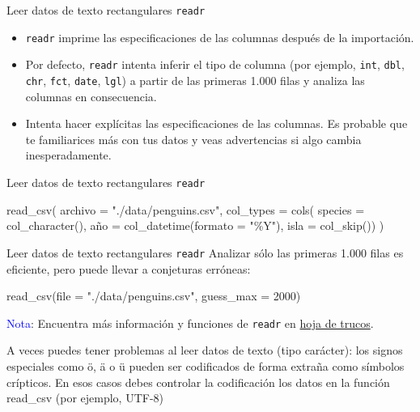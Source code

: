\documentclass[
  ignorenonframetext,
  aspectratio=169]{beamer}
\newenvironment{Shaded}{\begin{snugshade}}{\end{snugshade}}
\newcommand{\AttributeTok}[1]{\textcolor[rgb]{0.77,0.63,0.00}{#1}}
\newcommand{\DecValTok}[1]{\textcolor[rgb]{0.00,0.00,0.81}{#1}}
\newcommand{\FunctionTok}[1]{\textcolor[rgb]{0.00,0.00,0.00}{#1}}
\newcommand{\NormalTok}[1]{#1}
\newcommand{\OtherTok}[1]{\textcolor[rgb]{0.56,0.35,0.01}{#1}}
\newcommand{\StringTok}[1]{\textcolor[rgb]{0.31,0.60,0.02}{#1}}
\newcommand\blue[1]{\textcolor{blue}{#1}}
\begin{document}
\begin{frame}[fragile]{Leer datos de texto rectangulares \texttt{readr}}
\protect\hypertarget{leer-datos-de-texto-rectangulares-readr-5}{}
\begin{itemize}
\item
  \texttt{readr} imprime las especificaciones de las columnas después de
  la importación.
\item
  Por defecto, \texttt{readr} intenta inferir el tipo de columna (por
  ejemplo, \texttt{int}, \texttt{dbl}, \texttt{chr}, \texttt{fct},
  \texttt{date}, \texttt{lgl}) a partir de las primeras 1.000 filas y
  analiza las columnas en consecuencia.
\item
  Intenta hacer explícitas las especificaciones de las columnas. Es
  probable que te familiarices más con tus datos y veas advertencias si
  algo cambia inesperadamente.
\end{itemize}
\end{frame}

\begin{frame}[fragile]{Leer datos de texto rectangulares \texttt{readr}}
\protect\hypertarget{leer-datos-de-texto-rectangulares-readr-6}{}
\begin{Shaded}
\begin{Highlighting}[]
\FunctionTok{read\_csv}\NormalTok{(}
  \AttributeTok{archivo =} \StringTok{"./data/penguins.csv"}\NormalTok{,}
  \AttributeTok{col\_types =} \FunctionTok{cols}\NormalTok{(}
    \AttributeTok{species =} \FunctionTok{col\_character}\NormalTok{(),}
\NormalTok{    año }\OtherTok{=} \FunctionTok{col\_datetime}\NormalTok{(}\AttributeTok{formato =} \StringTok{"\%Y"}\NormalTok{),}
    \AttributeTok{isla =} \FunctionTok{col\_skip}\NormalTok{())}
\NormalTok{  )}
\end{Highlighting}
\end{Shaded}
\end{frame}

\begin{frame}[fragile]{Leer datos de texto rectangulares \texttt{readr}}
\protect\hypertarget{leer-datos-de-texto-rectangulares-readr-7}{}
Analizar sólo las primeras 1.000 filas es eficiente, pero puede llevar a
conjeturas erróneas:

\begin{Shaded}
\begin{Highlighting}[]
\FunctionTok{read\_csv}\NormalTok{(}\AttributeTok{file =} \StringTok{"./data/penguins.csv"}\NormalTok{, }\AttributeTok{guess\_max =} \DecValTok{2000}\NormalTok{)}
\end{Highlighting}
\end{Shaded}

\blue{Nota}: Encuentra más información y funciones de \texttt{readr} en
\href{https://raw.githubusercontent.com/rstudio/cheatsheets/master/data-import.pdf}{hoja
de trucos}.

\hfill\break

A veces puedes tener problemas al leer datos de texto (tipo carácter):
los signos especiales como ö, ä o ü pueden ser codificados de forma
extraña como símbolos crípticos. En esos casos debes controlar la
codificación los datos en la función read\_csv (por ejemplo, UTF-8)
\end{frame}
\end{document}
